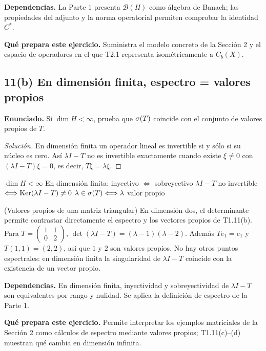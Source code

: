 \noindent\textbf{Dependencias.} La Parte 1 presenta $\mathcal B(H)$ como álgebra de Banach; las propiedades del adjunto y la norma operatorial permiten comprobar la identidad $C^*$.

\noindent\textbf{Qué prepara este ejercicio.} Suministra el modelo concreto de la Sección 2 y el espacio de operadores en el que T2.1 representa isométricamente a $C_b(X)$.

\subsection*{11(b) En dimensión finita, espectro = valores propios}

\noindent\textbf{Enunciado.} Si $\dim H<\infty$, prueba que $\sigma(T)$ coincide con el conjunto de valores propios de $T$.

\begin{proof}[Solución]
En dimensión finita un operador lineal es invertible si y sólo si su núcleo es cero. Así
$\lambda I-T$ no es invertible exactamente cuando existe $\xi\neq0$ con
$(\lambda I-T)\xi=0$, es decir, $T\xi=\lambda\xi$.
\end{proof}

\proofdiagram
{$\dim H<\infty$}
{En dimensión finita: inyectivo $\Longleftrightarrow$ sobreyectivo}
{$\lambda I-T$ no invertible $\Longleftrightarrow\operatorname{Ker}(\lambda I-T)\neq0$}
{$\lambda\in\sigma(T)\Longleftrightarrow\lambda$ valor propio}

\begin{cthejemplo}{(Valores propios de una matriz triangular)}
En dimensión dos, el determinante permite contrastar directamente el espectro y los
vectores propios de T1.11(b).
Para $T=\begin{pmatrix}1&1\\0&2\end{pmatrix}$,
$\det(\lambda I-T)=(\lambda-1)(\lambda-2)$.
Además $Te_1=e_1$ y $T(1,1)=(2,2)$, así que $1$ y $2$ son valores propios.
No hay otros puntos espectrales: en dimensión finita la singularidad de $\lambda I-T$
coincide con la existencia de un vector propio.
\end{cthejemplo}

\noindent\textbf{Dependencias.} En dimensión finita, inyectividad y sobreyectividad de $\lambda I-T$ son equivalentes por rango y nulidad. Se aplica la definición de espectro de la Parte 1.

\noindent\textbf{Qué prepara este ejercicio.} Permite interpretar los ejemplos matriciales de la Sección 2 como cálculos de espectro mediante valores propios; T1.11(c)--(d) muestran qué cambia en dimensión infinita.

